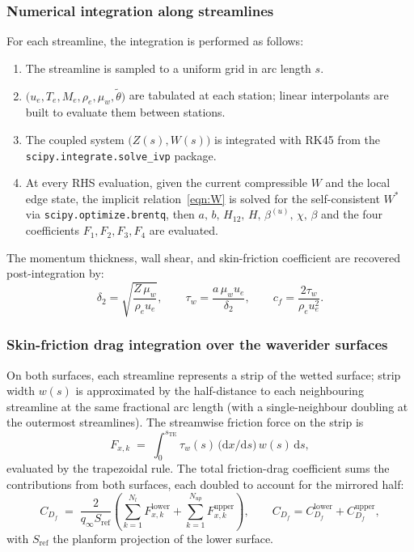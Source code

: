 \documentclass[10pt,a4paper]{article}
\begin{document}
\subsubsection{Numerical integration along streamlines}
For each streamline, the integration is performed as follows:
\begin{enumerate}[leftmargin=*]
  \item The streamline is sampled to a uniform grid in arc length $s$.
  \item $\bigl(u_e,T_e,M_e,\rho_e,\mu_w,\widetilde{\theta}\bigr)$ are tabulated at each station; linear interpolants are built to evaluate them between stations.
  \item The coupled system $\bigl(Z(s),W(s)\bigr)$ is integrated with RK45 from the \texttt{scipy.integrate.solve\_ivp} package.
  \item At every RHS evaluation, given the current compressible $W$ and the local edge state, the implicit relation~\eqref{eqn:W} is solved for the self-consistent $W^\ast$ via \texttt{scipy.optimize.brentq}, then $a,\,b,\,H_{12},\,H,\,\beta^{(u)},\,\chi,\,\beta$ and the four coefficients $F_1,F_2,F_3,F_4$ are evaluated.
\end{enumerate}
The momentum thickness, wall shear, and skin-friction coefficient are recovered post-integration by:
\begin{equation}
    \delta_2 = \sqrt{\frac{Z\,\mu_w}{\rho_e u_e}},\qquad
    \tau_w   = \frac{a\,\mu_w u_e}{\delta_2},\qquad
    c_f      = \frac{2\tau_w}{\rho_e u_e^2}.
    \label{eq:tauw}
\end{equation}

\subsubsection{Skin-friction drag integration over the waverider surfaces}
On both surfaces, each streamline represents a strip of the wetted surface; strip width $w(s)$ is approximated by the half-distance to each neighbouring streamline at the same fractional arc length (with a single-neighbour doubling at the outermost streamlines).  The streamwise friction force on the strip is
\begin{equation}
    F_{x,k} \;=\; \int_0^{s_{\mathrm{TE}}}
        \tau_w(s)\,\bigl(\mathrm{d}x/\mathrm{d}s\bigr)\,w(s)\,\mathrm{d}s,
\end{equation}
evaluated by the trapezoidal rule.  The total friction-drag coefficient sums the contributions from both surfaces, each doubled to account for the mirrored half:
\begin{equation}
    C_{D_f}
    \;=\; \frac{2}{q_\infty S_{\mathrm{ref}}}
    \!\left(
        \sum_{k=1}^{N_l} F_{x,k}^{\mathrm{lower}}
      + \sum_{k=1}^{N_{up}} F_{x,k}^{\mathrm{upper}}
    \right),
    \qquad
    C_{D_f} = C_{D_f}^{\mathrm{lower}} + C_{D_f}^{\mathrm{upper}},
\end{equation}
with $S_{\mathrm{ref}}$ the planform projection of the lower surface.
\end{document}
